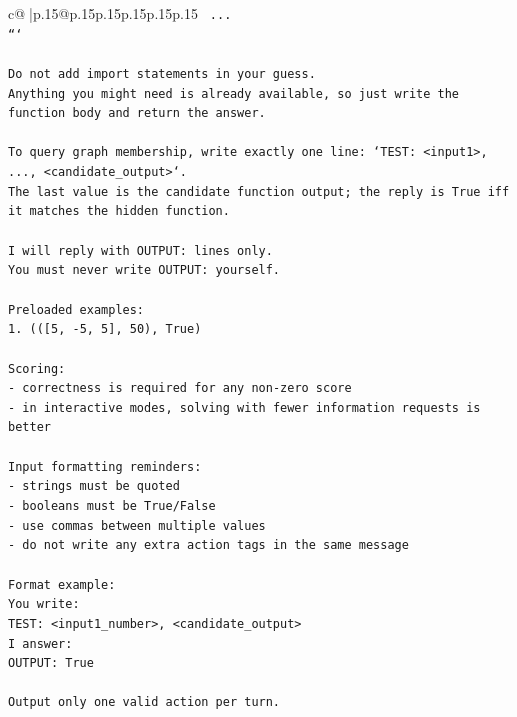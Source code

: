 \documentclass{article}
\begin{document}
{\begin{supertabular}{c@{$\;$}|p{.15\linewidth}@{}p{.15\linewidth}p{.15\linewidth}p{.15\linewidth}p{.15\linewidth}p{.15\linewidth}}
{{{\texttt{    ...} \\
\texttt{```} \\
\\ 
\texttt{Do not add import statements in your guess.} \\
\texttt{Anything you might need is already available, so just write the function body and return the answer.} \\
\\ 
\texttt{To query graph membership, write exactly one line: `TEST: <input1>, ..., <candidate\_output>`.} \\
\texttt{The last value is the candidate function output; the reply is True iff it matches the hidden function.} \\
\\ 
\texttt{I will reply with OUTPUT: lines only.} \\
\texttt{You must never write OUTPUT: yourself.} \\
\\ 
\texttt{Preloaded examples:} \\
\texttt{1. (({[}5, {-}5, 5{]}, 50), True)} \\
\\ 
\texttt{Scoring:} \\
\texttt{{-} correctness is required for any non{-}zero score} \\
\texttt{{-} in interactive modes, solving with fewer information requests is better} \\
\\ 
\texttt{Input formatting reminders:} \\
\texttt{{-} strings must be quoted} \\
\texttt{{-} booleans must be True/False} \\
\texttt{{-} use commas between multiple values} \\
\texttt{{-} do not write any extra action tags in the same message} \\
\\ 
\texttt{Format example:} \\
\texttt{You write:} \\
\texttt{TEST: <input1\_number>, <candidate\_output>} \\
\texttt{I answer:} \\
\texttt{OUTPUT: True} \\
\\ 
\texttt{Output only one valid action per turn.} \\
            }
        }
    }
     \\ \\


\end{supertabular}}
\end{document}
